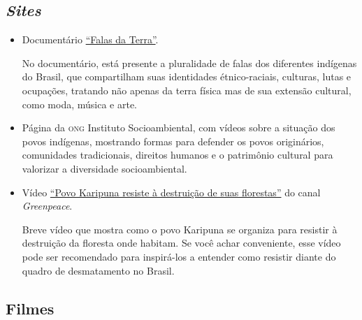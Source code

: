 \documentclass[11pt]{extarticle}
\begin{document}
\subsection{\textit{Sites}}

\begin{itemize}
\item Documentário \href{https://www.youtube.com/watch?v=repPmoz8ozQ}{“Falas da Terra”}.

No documentário, está presente a pluralidade de falas dos diferentes indígenas do Brasil, que compartilham suas identidades étnico-raciais, culturas, lutas e ocupações, tratando não apenas da terra física mas de sua extensão cultural, como moda, música e arte.

\item Página da \textsc{ong} Instituto Socioambiental, com vídeos sobre a situação dos povos indígenas, mostrando formas para defender os povos originários, comunidades tradicionais, direitos humanos e o patrimônio cultural para valorizar a diversidade socioambiental. 

\item Vídeo \href{https://www.youtube.com/watch?v=-aXBbySnijg}{“Povo Karipuna resiste à destruição de suas florestas”} do canal \textit{Greenpeace}. 

Breve vídeo que mostra como o povo Karipuna se organiza para resistir à destruição da floresta onde habitam. Se você achar conveniente, esse vídeo pode ser recomendado para inspirá-los a entender como resistir diante do quadro de desmatamento no Brasil. 
\end{itemize}

\subsection{Filmes}
\end{document}
